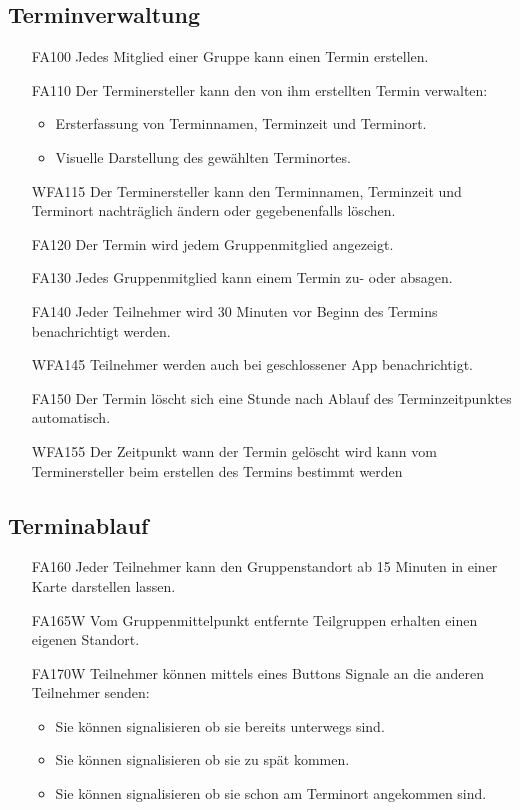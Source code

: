 \documentclass{scrartcl}
\begin{document}
	\subsection{Terminverwaltung}
	\begin{itemize}
		\item[FA100] Jedes Mitglied einer Gruppe kann einen Termin erstellen.
		\item[FA110] Der Terminersteller kann den von ihm erstellten Termin verwalten:
		\begin{itemize}
			\item Ersterfassung von Terminnamen, Terminzeit und Terminort.
		\end{itemize}
		
		\begin{itemize}
			\item Visuelle Darstellung des gewählten Terminortes. 
		\end{itemize}
		
		
		\item[WFA115] Der Terminersteller kann den Terminnamen, Terminzeit und Terminort nachträglich ändern oder 				gegebenenfalls löschen.
		
		\item[FA120] Der Termin wird jedem Gruppenmitglied angezeigt.
		\item[FA130] Jedes Gruppenmitglied kann einem Termin zu- oder absagen.
		\item[FA140] Jeder Teilnehmer wird 30 Minuten vor Beginn des Termins benachrichtigt werden.
		\item[WFA145] Teilnehmer werden auch bei geschlossener App benachrichtigt.
		\item[FA150] Der Termin löscht sich eine Stunde nach Ablauf des Terminzeitpunktes automatisch.
		\item[WFA155] Der Zeitpunkt wann der Termin gelöscht wird kann vom Terminersteller beim erstellen des Termins 					bestimmt werden
		
		
	\end{itemize}
	
	\subsection{Terminablauf}
	\begin{itemize}
		\item[FA160] Jeder Teilnehmer kann den Gruppenstandort ab 15 Minuten in einer Karte darstellen lassen.
		\item[FA165W] Vom Gruppenmittelpunkt entfernte Teilgruppen  erhalten einen eigenen Standort. 
		\item[FA170W] Teilnehmer können mittels eines Buttons Signale an die anderen Teilnehmer senden:
		\begin{itemize}
			\item Sie können signalisieren ob sie bereits unterwegs sind.
			\item Sie können signalisieren ob sie zu spät kommen.
			\item Sie können signalisieren ob sie schon am Terminort angekommen sind.
		\end{itemize}
	\end{itemize}
		
\end{document}
